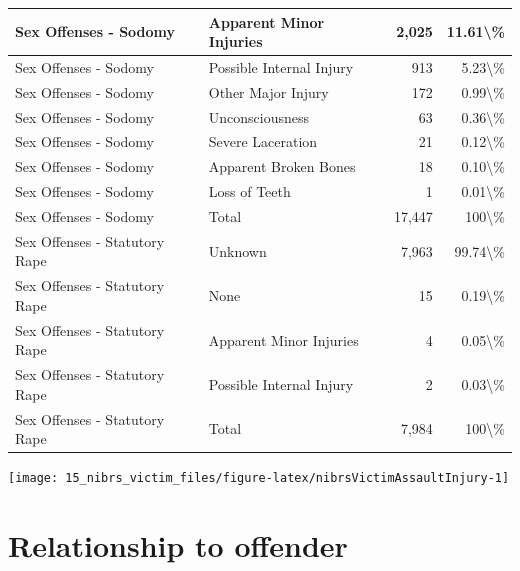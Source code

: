 \documentclass[
]{krantz}
\let\origfigure\figure
\let\endorigfigure\endfigure
\renewenvironment{figure}[1][2] {
    \expandafter\origfigure\expandafter[H]
} {
    \endorigfigure
}
\begin{document}
\begin{longtable}[t]{l|l|r|r}
\hline
Sex Offenses - Sodomy & Apparent Minor Injuries & 2,025 & 11.61\textbackslash{}\%\\
\hline
Sex Offenses - Sodomy & Possible Internal Injury & 913 & 5.23\textbackslash{}\%\\
\hline
Sex Offenses - Sodomy & Other Major Injury & 172 & 0.99\textbackslash{}\%\\
\hline
Sex Offenses - Sodomy & Unconsciousness & 63 & 0.36\textbackslash{}\%\\
\hline
Sex Offenses - Sodomy & Severe Laceration & 21 & 0.12\textbackslash{}\%\\
\hline
Sex Offenses - Sodomy & Apparent Broken Bones & 18 & 0.10\textbackslash{}\%\\
\hline
Sex Offenses - Sodomy & Loss of Teeth & 1 & 0.01\textbackslash{}\%\\
\hline
Sex Offenses - Sodomy & Total & 17,447 & 100\textbackslash{}\%\\
\hline
Sex Offenses - Statutory Rape & Unknown & 7,963 & 99.74\textbackslash{}\%\\
\hline
Sex Offenses - Statutory Rape & None & 15 & 0.19\textbackslash{}\%\\
\hline
Sex Offenses - Statutory Rape & Apparent Minor Injuries & 4 & 0.05\textbackslash{}\%\\
\hline
Sex Offenses - Statutory Rape & Possible Internal Injury & 2 & 0.03\textbackslash{}\%\\
\hline
Sex Offenses - Statutory Rape & Total & 7,984 & 100\textbackslash{}\%\\
\hline
\end{longtable}

\begin{figure}

{\centering \texttt{[image: 15\_nibrs\_victim\_files/figure-latex/nibrsVictimAssaultInjury-1]} 

}

\caption{Victim injury for assault offenses, by injury severity, 1991-2022. Major injury is all injury types other than 'none' and 'apparent minor injuries' which are 'other major injury,' 'severe laceration,' possible internal injury,' apparent broken bones,' 'unconsciousness,' and 'loss of teeth.'}\label{fig:nibrsVictimAssaultInjury}
\end{figure}

\section{Relationship to
offender}\label{relationship-to-offender}
\end{document}
